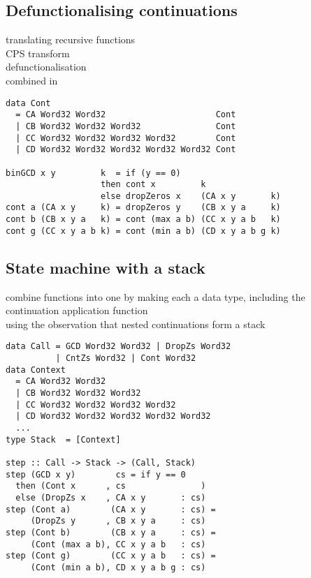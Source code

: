 \documentclass[preprint]{sigplanconf}
\def\codefamily{\sffamily\normalsize}
\def\codesmall{\sffamily\small}
\begin{document}
\subsection{Defunctionalising continuations}
translating recursive functions \cite{Ingmar} \cite{Zhai} \\
CPS transform \cite{AppelCwC} \\
defunctionalisation \cite{Reynolds} \\
combined in \cite{CCC}

\lstset{basicstyle=\codesmall}
\begin{lstlisting}
data Cont
  = CA Word32 Word32                      Cont
  | CB Word32 Word32 Word32               Cont
  | CC Word32 Word32 Word32 Word32        Cont
  | CD Word32 Word32 Word32 Word32 Word32 Cont

binGCD x y         k  = if (y == 0)
                   then cont x         k
                   else dropZeros x    (CA x y       k)
cont a (CA x y     k) = dropZeros y    (CB x y a     k)
cont b (CB x y a   k) = cont (max a b) (CC x y a b   k)
cont g (CC x y a b k) = cont (min a b) (CD x y a b g k)
\end{lstlisting}
\lstset{basicstyle=\codefamily}

\subsection{State machine with a stack}
combine functions into one by making each a data type, including the continuation application function \\
using the observation that nested continuations form a stack

\begin{lstlisting}
data Call = GCD Word32 Word32 | DropZs Word32
          | CntZs Word32 | Cont Word32
data Context
  = CA Word32 Word32
  | CB Word32 Word32 Word32
  | CC Word32 Word32 Word32 Word32
  | CD Word32 Word32 Word32 Word32 Word32
  ...
type Stack  = [Context]

step :: Call -> Stack -> (Call, Stack)
step (GCD x y)        cs = if y == 0
  then (Cont x      , cs               )
  else (DropZs x    , CA x y       : cs)
step (Cont a)        (CA x y       : cs) =
     (DropZs y      , CB x y a     : cs)
step (Cont b)        (CB x y a     : cs) =
     (Cont (max a b), CC x y a b   : cs)
step (Cont g)        (CC x y a b   : cs) =
     (Cont (min a b), CD x y a b g : cs)
\end{lstlisting}
\end{document}
